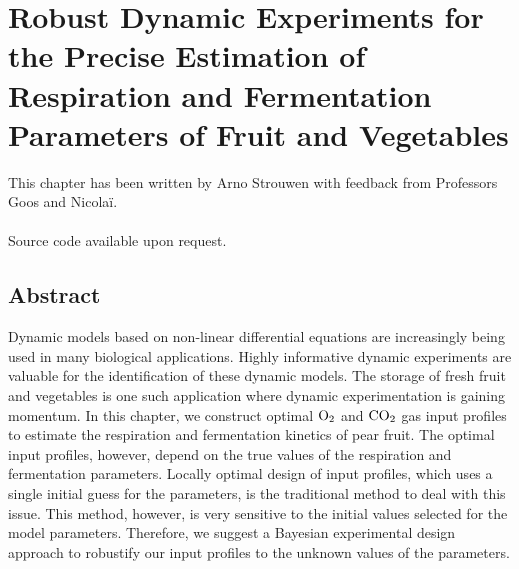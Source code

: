 \chapter{Robust Dynamic Experiments for the Precise Estimation of Respiration and Fermentation Parameters of Fruit and Vegetables}
\label{paper2}
This chapter has been written by Arno Strouwen with feedback from Professors Goos and Nicolaï.
\\
\\
{\color{red}Source code available upon request.}
\section*{Abstract}
Dynamic models based on non-linear differential equations are increasingly being used in many biological applications. Highly informative dynamic experiments are valuable for the identification of these dynamic models. The storage of fresh fruit and vegetables is one such application where dynamic experimentation is gaining momentum. In this chapter, we construct optimal $\text{O}_2$ and $\text{CO}_2$ gas input profiles to estimate the respiration and fermentation kinetics of pear fruit. The optimal input profiles, however, depend on the true values of the respiration and fermentation parameters. Locally optimal design of input profiles, which uses a single initial guess for the parameters, is the traditional method to deal with this issue. This method, however, is very sensitive to the initial values selected for the model parameters. Therefore, we suggest a Bayesian experimental design approach to robustify our input profiles to the unknown values of the parameters.
